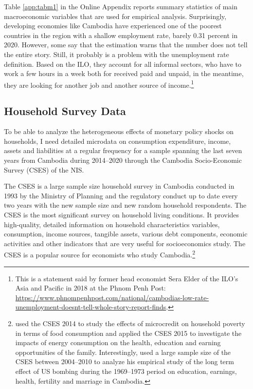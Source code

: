 \documentclass[11pt,letterpaper]{article}
\begin{document}
Table \ref{app:tabm1} in the Online Appendix reports summary statistics of main macroeconomic variables that are used for empirical analysis. Surprisingly, developing economies like Cambodia have experienced one of the poorest countries in the region with a shallow employment rate, barely 0.31 percent in 2020. However, some say that the estimation warns that the number does not tell the entire story. Still, it probably is a problem with the unemployment rate definition. Based on the ILO, they account for all informal sectors, who have to work a few hours in a week both for received paid and unpaid, in the meantime, they are looking for another job and another source of income.\footnote{This is a statement said by former head economist Sera Elder of the ILO’s Asia and Pacific in 2018 at the Phnom Penh Post: \url{https://www.phnompenhpost.com/national/cambodias-low-rate-unemployment-doesnt-tell-whole-story-report-finds}.}



\subsection{Household Survey Data}\label{sec:data2}	

To be able to analyze the heterogeneous effects of monetary policy shocks on households, I need detailed microdata on consumption expenditure, income, assets and liabilities at a regular frequency for a sample spanning the last seven years from Cambodia during 2014--2020 through the Cambodia Socio-Economic Survey (CSES) of the NIS. 

The CSES is a large sample size household survey in Cambodia conducted in 1993 by the Ministry of Planning and the regulatory conduct up to date every two years with the new sample size and new random household respondents. The CSES is the most significant survey on household living conditions. It provides high-quality, detailed information on household characteristics variables, consumption, income sources, tangible assets, various debt components, economic activities and other indicators that are very useful for socioeconomics study. The CSES is a popular source for economists who study Cambodia.\footnote{\citet{Seng2018} used the CSES 2014 to study the effects of microcredit on household poverty in terms of food consumption and \citet{Phoumin2019} applied the CSES 2015 to investigate the impacts of energy consumption on the health, education and earning opportunities of the family. Interestingly, \citet{Saing2019} used a large sample size of the CSES between 2004--2010 to analyze his empirical study of the long term effect of US bombing during the 1969--1973 period on education, earnings, health, fertility and marriage in Cambodia.} 
\end{document}
